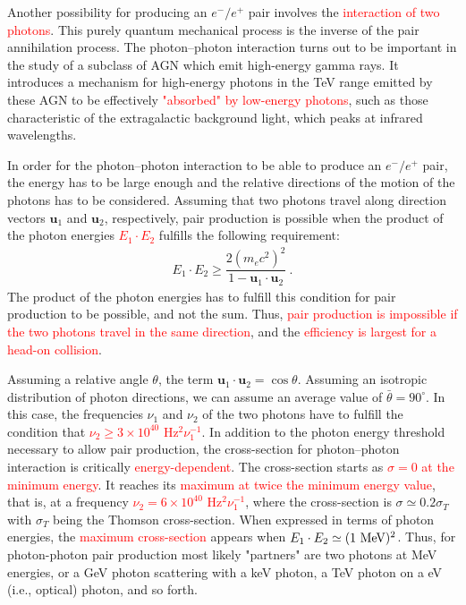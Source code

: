 \documentclass[12pt,a4paper]{article}
\renewcommand{\vec}[1]{\boldsymbol{#1}}
\begin{document}
Another possibility for producing an $e^-/e^+$ pair involves the \textcolor{red}{interaction of two photons}. This purely quantum mechanical process is the inverse of the pair annihilation process. The photon–photon interaction turns out to be important in the study of a subclass of AGN which emit high-energy gamma rays. It introduces a mechanism for high-energy photons in the TeV range emitted by these AGN to be effectively \textcolor{red}{"absorbed" by low-energy photons}, such as those characteristic of the extragalactic background light, which peaks at infrared wavelengths.

In order for the photon–photon interaction to be able to produce an $e^-/e^+$ pair, the energy has to be large enough and the relative directions of the motion of the photons has to be considered. Assuming that two photons travel along direction
vectors $\vec{u}_1$ and $\vec{u}_2$, respectively, pair production is possible when the product of the photon energies \textcolor{red}{$E_1 \cdot E_2$} fulfills the following requirement:
\begin{align}
E_1 \cdot E_2 \geqslant \dfrac{2(m_e c^2)^2}{1-\vec{u}_1 \cdot \vec{u}_2} ~.
\end{align}
The product of the photon energies has to fulfill this condition for pair production to be possible, and not the sum. Thus, \textcolor{red}{pair production is impossible if the two photons travel in the same direction}, and the \textcolor{red}{efficiency is largest for a head-on collision}. 

Assuming a relative angle $\theta$, the term $\vec{u}_1 \cdot \vec{u}_2 = \cos \theta$. Assuming an isotropic distribution of photon directions, we can assume an average value of $\bar{\theta} = 90^\circ$. In this case, the frequencies $\nu_1$ and $\nu_2$ of the two photons have to fulfill the condition that \textcolor{red}{$\nu_2 \geqslant 3 \times 10^{40}$ Hz$^2 \nu_1^{-1}$}. In addition to the photon energy threshold necessary to allow pair production, the cross-section for photon–photon interaction is critically \textcolor{red}{energy-dependent}. The cross-section starts as \textcolor{red}{$\sigma = 0$ at the minimum energy}. It reaches its \textcolor{red}{maximum at twice the minimum energy value}, that is, at a frequency \textcolor{red}{$\nu_2 = 6 \times 10^{40}$ Hz$^2 \nu_1^{-1}$}, where the cross-section is $\sigma \simeq 0.2 \sigma_T$ with $\sigma_T$ being the Thomson cross-section. When expressed in terms of photon energies, the \textcolor{red}{maximum cross-section} appears when \textcolor{red}{$E_1 \cdot E_2 \simeq (1 ~\rm MeV)^2$}. Thus, for photon-photon pair production most likely "partners" are two photons at MeV energies, or a GeV photon scattering with a keV photon, a TeV photon on a eV (i.e., optical) photon, and so forth.
\end{document}
